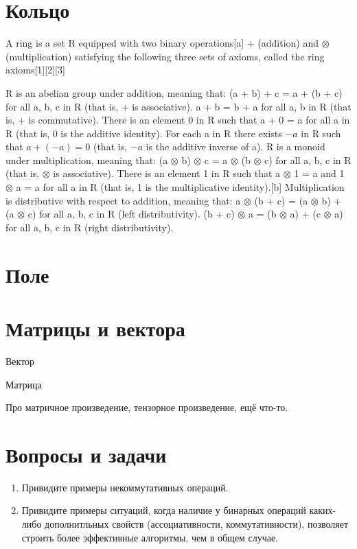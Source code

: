 \section{Кольцо}


A ring is a set R equipped with two binary operations[a] + (addition) and $\otimes$ (multiplication) satisfying the following three sets of axioms, called the ring axioms[1][2][3]

R is an abelian group under addition, meaning that:
(a + b) + c = a + (b + c) for all a, b, c in R   (that is, + is associative).
a + b = b + a for all a, b in R   (that is, + is commutative).
There is an element 0 in R such that a + 0 = a for all a in R   (that is, 0 is the additive identity).
For each a in R there exists $-a$ in R such that $a + (-a) = 0$   (that is, $-a$ is the additive inverse of a).
R is a monoid under multiplication, meaning that:
(a $\otimes$ b) $\otimes$ c = a $\otimes$ (b $\otimes$ c) for all a, b, c in R   (that is, $\otimes$ is associative).
There is an element 1 in R such that a $\otimes$ 1 = a and 1 $\otimes$ a = a for all a in R   (that is, 1 is the multiplicative identity).[b]
Multiplication is distributive with respect to addition, meaning that:
a $\otimes$ (b + c) = (a $\otimes$ b) + (a $\otimes$ c) for all a, b, c in R   (left distributivity).
(b + c) $\otimes$ a = (b $\otimes$ a) + (c $\otimes$ a) for all a, b, c in R   (right distributivity).


\section{Поле}

\section{Матрицы и вектора}

Вектор

Матрица 

Про матричное произведение, тензорное произведение, ещё что-то.

\section{Вопросы и задачи}
\begin{enumerate}
	\item Привидите примеры некоммутативных операций.
	\item Привидите примеры ситуаций, когда наличие у бинарных операций каких-либо дополнитльных свойств (ассоциативности, коммутативности), позволяет строить более эффективные алгоритмы, чем в общем случае.
\end{enumerate}